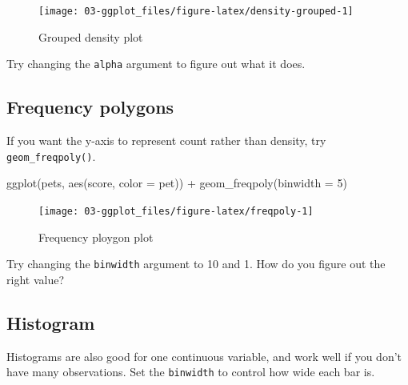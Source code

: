 \documentclass[
  oneside]{book}
\newenvironment{Shaded}{\begin{snugshade}}{\end{snugshade}}
\newcommand{\AttributeTok}[1]{\textcolor[rgb]{0.77,0.63,0.00}{#1}}
\newcommand{\DecValTok}[1]{\textcolor[rgb]{0.00,0.00,0.81}{#1}}
\newcommand{\FunctionTok}[1]{\textcolor[rgb]{0.00,0.00,0.00}{#1}}
\newcommand{\NormalTok}[1]{#1}
\newcommand{\SpecialCharTok}[1]{\textcolor[rgb]{0.00,0.00,0.00}{#1}}
\begin{document}
\begin{figure}

{\centering \texttt{[image: 03-ggplot\_files/figure-latex/density-grouped-1]} 

}

\caption{Grouped density plot}\label{fig:density-grouped}
\end{figure}

\begin{try}
Try changing the \texttt{alpha} argument to figure out what it does.

\end{try}

\hypertarget{geom_freqpoly}{%
\subsection{Frequency polygons}\label{geom_freqpoly}}

If you want the y-axis to represent count rather than density, try \texttt{geom\_freqpoly()}.

\begin{Shaded}
\begin{Highlighting}[]
\FunctionTok{ggplot}\NormalTok{(pets, }\FunctionTok{aes}\NormalTok{(score, }\AttributeTok{color =}\NormalTok{ pet)) }\SpecialCharTok{+}
  \FunctionTok{geom\_freqpoly}\NormalTok{(}\AttributeTok{binwidth =} \DecValTok{5}\NormalTok{)}
\end{Highlighting}
\end{Shaded}

\begin{figure}

{\centering \texttt{[image: 03-ggplot\_files/figure-latex/freqpoly-1]} 

}

\caption{Frequency ploygon plot}\label{fig:freqpoly}
\end{figure}

\begin{try}
Try changing the \texttt{binwidth} argument to 10 and 1. How do you figure out the right value?

\end{try}

\hypertarget{geom_histogram}{%
\subsection{Histogram}\label{geom_histogram}}

Histograms are also good for one continuous variable, and work well if you don't have many observations. Set the \texttt{binwidth} to control how wide each bar is.
\end{document}

